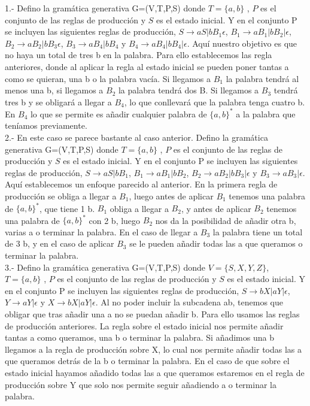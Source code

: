 \documentclass[a4paper,11pt]{article}
\begin{document}
1.- Defino la gramática generativa G=(V,T,P,S) donde $T=\{a,b\}$ , $P$ es el conjunto de las reglas de producción y $S$ es el estado inicial. Y en el conjunto P se incluyen las siguientes reglas de producción, $S \rightarrow aS|bB_1 \epsilon$, $B_1\rightarrow aB_1|bB_2|\epsilon$, $B_2 \rightarrow aB_2|bB_3\epsilon$, $B_3 \rightarrow aB_4|bB_4$ y $B_4 \rightarrow aB_4|bB_4|\epsilon$. Aquí nuestro objetivo es que no haya un total de tres b en la palabra. Para ello establecemos las regla anteriores, donde al aplicar la regla al estado inicial se pueden poner tantas a como se quieran, una b o la palabra vacía. Si llegamos a $B_1$ la palabra tendrá al menos una b, si llegamos a $B_2$ la palabra tendrá  dos B. Si llegamos a $B_3$ tendrá tres b y se obligará a llegar a $B_4$, lo que conllevará que la palabra tenga cuatro b. En $B_4$ lo que se permite es añadir cualquier palabra de $\{a,b\}^*$ a la palabra que teníamos previamente.\\

2.- En este caso se parece bastante al caso anterior. Defino la gramática generativa G=(V,T,P,S) donde $T=\{a,b\}$ , $P$ es el conjunto de las reglas de producción y $S$ es el estado inicial. Y en el conjunto P se incluyen las siguientes reglas de producción, $S \rightarrow aS|bB_1$, $B_1 \rightarrow aB_1|bB_2$, $B_2 \rightarrow aB_2|bB_3|\epsilon$ y $B_3 \rightarrow aB_3|\epsilon$. Aquí establecemos un enfoque parecido al anterior. En la primera regla de producción se obliga a llegar a $B_1$, luego antes de aplicar $B_1$ tenemos una palabra de $\{a,b\}^*$, que tiene 1 b. $B_1$ obliga a llegar a $B_2$, y antes de aplicar $B_2$ tenemos una palabra de $\{a,b\}^*$ con 2 b, luego $B_2$ nos da la posibilidad de añadir otra b, varias a o terminar la palabra. En el caso de llegar a $B_3$ la palabra tiene un total de 3 b, y en el caso de aplicar $B_3$ se le pueden añadir todas las a que queramos o terminar la palabra.\\

3.- Defino la gramática generativa G=(V,T,P,S) donde $V=\{S,X,Y,Z\}$, $T=\{a,b\}$ , $P$ es el conjunto de las reglas de producción y $S$ es el estado inicial. Y en el conjunto P se incluyen las siguientes reglas de producción, $S \rightarrow bX|aY|\epsilon$, $Y \rightarrow aY|\epsilon$ y $X \rightarrow bX|aY|\epsilon$. Al no poder incluir la subcadena ab, tenemos que obligar que tras añadir una a no se puedan añadir b. Para ello usamos las reglas de producción anteriores. La regla sobre el estado inicial nos permite añadir tantas a como queramos, una b o terminar la palabra. Si añadimos una b llegamos a la regla de producción sobre X, lo cual nos permite añadir todas las a que queramos detrás de la b o terminar la palabra. En el caso de que sobre el estado inicial hayamos añadido todas las a que queramos estaremos en el regla de producción sobre Y que solo nos permite seguir añadiendo a o terminar la palabra. \\
\end{document}
